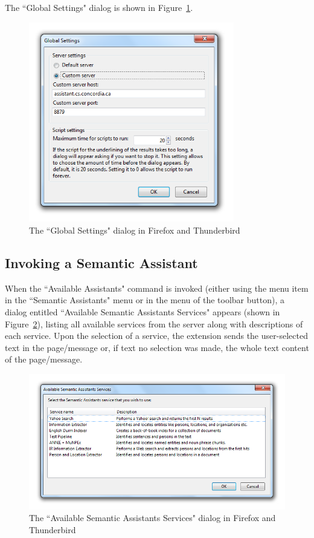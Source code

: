 The ``Global Settings" dialog is shown in Figure~\ref{fig:mozilla_features_global_settings}. 

\begin{figure}[htb]
  \centering
  \includegraphics[width=0.8\textwidth]{pictures/mozilla_features_global_settings.png}
  \caption{The ``Global Settings" dialog in Firefox and Thunderbird}
  \label{fig:mozilla_features_global_settings}
\end{figure}

\subsection{Invoking a Semantic Assistant}
When the ``Available Assistants" command is invoked (either using the menu item in the ``Semantic Assistants" menu or in the menu of the toolbar button), a dialog entitled ``Available Semantic Assistants Services" appears (shown in Figure~\ref{fig:mozilla_features_available_assistants_dialog}), listing all available services from the server along with descriptions of each service. Upon the selection of a service, the extension sends the user-selected text in the page/message or, if text no selection was made, the whole text content of the page/message.

\begin{figure}[htb]
  \centering
  \includegraphics[width=1\textwidth]{pictures/mozilla_features_available_assistants_dialog.png}
  \caption{The ``Available Semantic Assistants Services" dialog in Firefox and Thunderbird}
  \label{fig:mozilla_features_available_assistants_dialog}
\end{figure}

